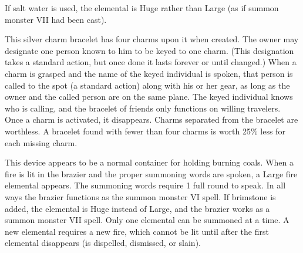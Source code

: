 {If salt water is used, the elemental is Huge rather than Large (as if summon monster VII had been cast).


 This silver charm bracelet has four charms upon it when created. The owner may designate one person known to him to be keyed to one charm. (This designation takes a standard action, but once done it lasts forever or until changed.) When a charm is grasped and the name of the keyed individual is spoken, that person is called to the spot (a standard action) along with his or her gear, as long as the owner and the called person are on the same plane. The keyed individual knows who is calling, and the bracelet of friends only functions on willing travelers. Once a charm is activated, it disappears. Charms separated from the bracelet are worthless. A bracelet found with fewer than four charms is worth 25\% less for each missing charm.


 This device appears to be a normal container for holding burning coals. When a fire is lit in the brazier and the proper summoning words are spoken, a Large fire elemental appears. The summoning words require 1 full round to speak. In all ways the brazier functions as the summon monster VI spell. If brimstone is added, the elemental is Huge instead of Large, and the brazier works as a summon monster VII spell. Only one elemental can be summoned at a time. A new elemental requires a new fire, which cannot be lit until after the first elemental disappears (is dispelled, dismissed, or slain).


\begin{comment}
Brooch of Shielding:} This appears to be a piece of silver or gold jewelry used to fasten a cloak or cape. In addition to this mundane task, it can absorb magic missiles of the sort generated by spell or spell-like ability. A brooch can absorb up to 101 points of damage from magic missiles before it melts and becomes useless.


\end{comment}}
